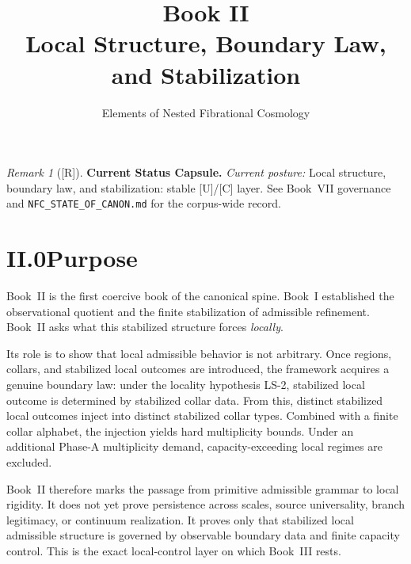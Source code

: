 \documentclass[12pt,oneside]{amsbook}
\theoremstyle{plain}
\theoremstyle{definition}
\theoremstyle{remark}
\newtheorem{remark}[theorem]{Remark}
\newcommand{\status}[1]{\textup{[#1]}}
\begin{document}
\title{Book II\\[6pt]Local Structure, Boundary Law, and Stabilization}
\author{Elements of Nested Fibrational Cosmology}
\date{}
\maketitle

\tableofcontents

\bigskip


\begin{remark}[\status{R}]\label{cap:book2-status}
\textbf{Current Status Capsule.} \emph{Current posture:} Local structure, boundary law, and stabilization: stable [U]/[C] layer. See Book~VII governance and \texttt{NFC\_STATE\_OF\_CANON.md} for the corpus-wide record.
\end{remark}

\section*{II.0\quad Purpose}

Book~II is the first coercive book of the canonical spine.  Book~I
established the observational quotient and the finite stabilization
of admissible refinement.  Book~II asks what this stabilized structure
forces \emph{locally}.

Its role is to show that local admissible behavior is not arbitrary.
Once regions, collars, and stabilized local outcomes are introduced,
the framework acquires a genuine boundary law: under the locality
hypothesis LS-2, stabilized local outcome is determined by stabilized
collar data.  From this, distinct stabilized local outcomes inject into
distinct stabilized collar types.  Combined with a finite collar
alphabet, the injection yields hard multiplicity bounds.  Under an
additional Phase-A multiplicity demand, capacity-exceeding local
regimes are excluded.

Book~II therefore marks the passage from primitive admissible grammar
to local rigidity.  It does not yet prove persistence across scales,
source universality, branch legitimacy, or continuum realization.  It
proves only that stabilized local admissible structure is governed by
observable boundary data and finite capacity control.  This is the
exact local-control layer on which Book~III rests.
\end{document}
